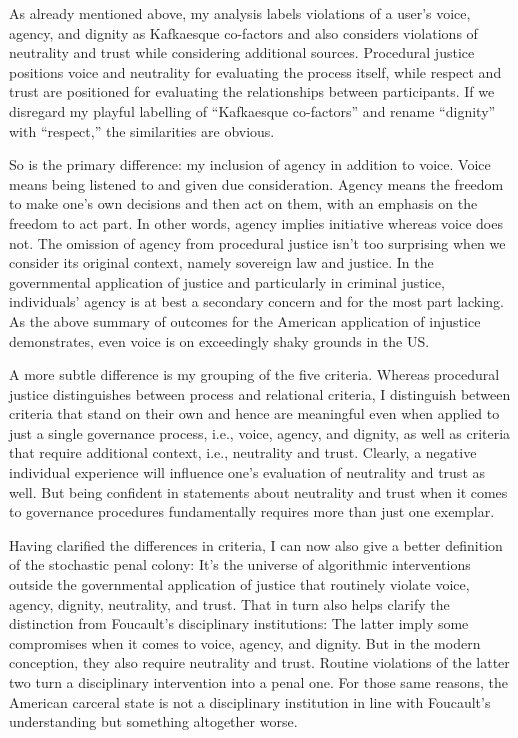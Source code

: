 As already mentioned above, my analysis labels violations of a user's voice,
agency, and dignity as Kafkaesque co-factors and also considers violations of
neutrality and trust while considering additional sources. Procedural justice
positions voice and neutrality for evaluating the process itself, while respect
and trust are positioned for evaluating the relationships between participants.
If we disregard my playful labelling of ``Kafkaesque co-factors'' and rename
``dignity'' with ``respect,'' the similarities are obvious.

So is the primary difference: my inclusion of agency in addition to voice. Voice
means being listened to and given due consideration. Agency means the freedom to
make one's own decisions and then act on them, with an emphasis on the freedom
to act part. In other words, agency implies initiative whereas voice does not.
The omission of agency from procedural justice isn't too surprising when we
consider its original context, namely sovereign law and justice. In the
governmental application of justice and particularly in criminal justice,
individuals' agency is at best a secondary concern and for the most part
lacking. As the above summary of outcomes for the American application of
injustice demonstrates, even voice is on exceedingly shaky grounds in the US.

A more subtle difference is my grouping of the five criteria. Whereas procedural
justice distinguishes between process and relational criteria, I distinguish
between criteria that stand on their own and hence are meaningful even when
applied to just a single governance process, i.e., voice, agency, and dignity,
as well as criteria that require additional context, i.e., neutrality and trust.
Clearly, a negative individual experience will influence one's evaluation of
neutrality and trust as well. But being confident in statements about neutrality
and trust when it comes to governance procedures fundamentally requires more
than just one exemplar.

Having clarified the differences in criteria, I can now also give a better
definition of the stochastic penal colony: It's the universe of algorithmic
interventions outside the governmental application of justice that routinely
violate voice, agency, dignity, neutrality, and trust. That in turn also helps
clarify the distinction from Foucault's disciplinary institutions: The latter
imply some compromises when it comes to voice, agency, and dignity. But in the
modern conception, they also require neutrality and trust. Routine violations of
the latter two turn a disciplinary intervention into a penal one. For those same
reasons, the American carceral state is not a disciplinary institution in line
with Foucault's understanding but something altogether worse.
